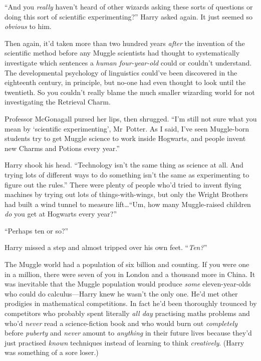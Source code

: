 “And you \emph{really} haven’t heard of other wizards asking these sorts of questions or doing this sort of scientific experimenting?” Harry asked again. It just seemed so \emph{obvious} to him.

Then again, it’d taken more than two hundred years \emph{after} the invention of the scientific method before any Muggle scientists had thought to systematically investigate which sentences a \emph{human four-year-old} could or couldn’t understand. The developmental psychology of linguistics could’ve been discovered in the eighteenth century, in principle, but no-one had even thought to look until the twentieth. So you couldn’t really blame the much smaller wizarding world for not investigating the Retrieval Charm.

Professor McGonagall pursed her lips, then shrugged. “I’m still not sure what you mean by ‘scientific experimenting’, Mr~Potter. As I said, I’ve seen Muggle-born students try to get Muggle science to work inside Hogwarts, and people invent new Charms and Potions every year.”

Harry shook his head. “Technology isn’t the same thing as science at all. And trying lots of different ways to do something isn’t the same as experimenting to figure out the rules.” There were plenty of people who’d tried to invent flying machines by trying out lots of things-with-wings, but only the Wright Brothers had built a wind tunnel to measure lift…“Um, how many Muggle-raised children \emph{do} you get at Hogwarts every year?”

“Perhaps ten or so?”

Harry missed a step and almost tripped over his own feet. “\emph{Ten?}”

The Muggle world had a population of six billion and counting. If you were one in a million, there were seven of you in London and a thousand more in China. It was inevitable that the Muggle population would produce \emph{some} eleven-year-olds who could do calculus—Harry knew he wasn’t the only one. He’d met other prodigies in mathematical competitions. In fact he’d been thoroughly trounced by competitors who probably spent literally \emph{all day} practising maths problems and who’d \emph{never} read a science-fiction book and who would burn out \emph{completely} before \emph{puberty} and \emph{never} amount to \emph{anything} in their future lives because they’d just practised \emph{known} techniques instead of learning to think \emph{creatively}. (Harry was something of a sore loser.)

